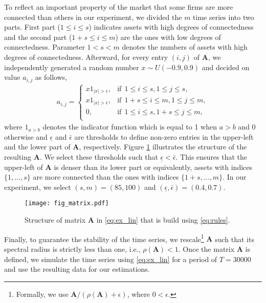 To reflect an important property of the market that some firms are more connected than others in our experiment, we divided the $m$ time series into two parts. 
First part ($1\leq i\leq s$) indicates assets with high degrees of connectedness and the second part ($1+s\leq i\leq m$) are the ones with low degrees of connectedness.
Parameter $1<s<m$ denotes the numbers of assets with high degrees of connectedness.
Afterward, for every entry $(i,j)$ of $\textbf{A}$, we independently generated a random number $x\sim U(-0.9, 0.9)$ and decided on value $a_{i,j}$ as follows,
\begin{align}\label{eq:rules}
    a_{i,j}=\left\{
\begin{array}{ll}
      x 1_{|x| > \underline{\epsilon} },  & \text{if}\ \ 1\leq i\leq s, 1\leq j\leq s, \\
      x 1_{|x| > \overline{\epsilon} },  & \text{if}\ \ 1+s\leq i\leq m, 1\leq j\leq m, \\
      0,  & \text{if}\ \ 1\leq i\leq s, 1+s\leq j\leq m, \\
\end{array} 
\right.
\end{align}
where $1_{a>b}$ denotes the indicator function which is equal to 1 when $a>b$ and $0$ otherwise and $\underline{\epsilon}$ and $\bar{\epsilon}$ are thresholds to define non-zero entries in the upper-left and the lower part of $\textbf{A}$, respectively.
Figure \ref{fig:matrix} illustrates the structure of the resulting $\textbf{A}$.
We select these thresholds such that $\underline{\epsilon}<\bar{\epsilon}$. 
This ensures that the upper-left of $\textbf{A}$ is denser than its lower part or equivalently, assets with indices $\{1,...,s\}$ are more connected than the ones with indices $\{1+s,...,m\}$.
In our experiment, we select $(s,m)=(85,100)$ and $(\underline{\epsilon},\bar{\epsilon})=(0.4,0.7)$. 
\begin{figure}
    \centering
    \texttt{[image: fig\_matrix.pdf]}
    \caption{Structure of matrix $\textbf{A}$ in \eqref{eq:ex_lin} that is build using \eqref{eq:rules}.}
    \label{fig:matrix}
\end{figure}
Finally, to guarantee the stability of the time series, we rescale\footnote{Formally, we use $\textbf{A}/(\rho(\textbf{A}) + \epsilon)$, where $0<\epsilon$.} $\textbf{A}$ such that its spectral radius is strictly less than one, i.e.,  $\rho(\textbf{A})< 1$. 
Once the matrix $\textbf{A}$ is defined, we simulate the time series using \eqref{eq:ex_lin} for a period of $T = 30000$ and use the resulting data for our estimations.

